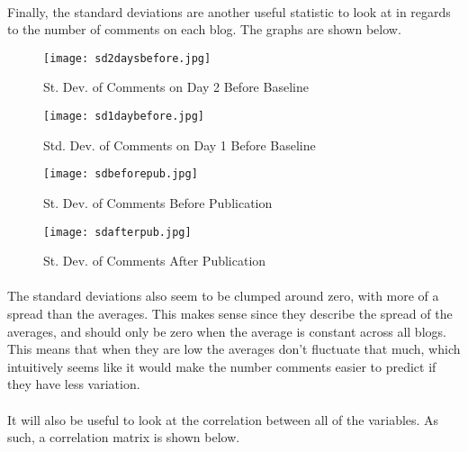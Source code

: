 \documentclass[paper=a4, fontsize=11pt]{scrartcl} %
\numberwithin{equation}{section} %
\numberwithin{figure}{section} %
\numberwithin{table}{section} %
\begin{document}
 \paragraph{}
 Finally, the standard deviations are another useful statistic to look at in regards to the number of comments on each blog. The graphs are shown below.
 
 
 \begin{figure}[H]
    \centering
    \begin{minipage}{0.45\textwidth}
        \centering
        \texttt{[image: sd2daysbefore.jpg]}
        \caption{St. Dev. of Comments on Day 2 Before Baseline}
    \end{minipage}\hfill
    \begin{minipage}{0.45\textwidth}
        \centering
        \texttt{[image: sd1daybefore.jpg]}
        \caption{Std. Dev. of Comments on Day 1 Before Baseline}
    \end{minipage}
\end{figure}

\begin{figure}[H]
    \centering
    \begin{minipage}{0.45\textwidth}
        \centering
        \texttt{[image: sdbeforepub.jpg]} 
        \caption{St. Dev. of Comments Before Publication}
    \end{minipage}\hfill
    \begin{minipage}{0.45\textwidth}
        \centering
        \texttt{[image: sdafterpub.jpg]} 
        \caption{St. Dev. of Comments After Publication}
    \end{minipage}
\end{figure}
 
\paragraph{}
The standard deviations also seem to be clumped around zero, with more of a spread than the averages. This makes sense since they describe the spread of the averages, and should only be zero when the average is constant across all blogs. This means that when they are low the averages don't fluctuate that much, which intuitively seems like it would make the number comments easier to predict if they have less variation.

\paragraph{}
It will also be useful to look at the correlation between all of the variables. As such, a correlation matrix is shown below.
\end{document}
